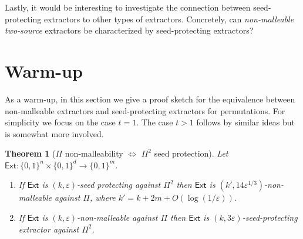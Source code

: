 \documentclass[11pt]{article}
\numberwithin{equation}{section}
\newtheorem{theorem}{Theorem}[section]
\theoremstyle{definition}
\theoremstyle{plain}
\newcommand{\ext}{\mathsf{Ext}}
\newcommand{\eps}{\varepsilon}
\newcommand{\perfam}{\Pi}
\begin{document}
Lastly, it would be interesting to investigate the connection between seed-protecting extractors to other types of extractors. Concretely, can \emph{non-malleable two-source} extractors be characterized by seed-protecting extractors?

%



\section{Warm-up}\label{sec:overview}

As a warm-up, in this section we give a proof sketch for the equivalence between non-malleable extractors and seed-protecting extractors for permutations. For simplicity we focus on the case $t = 1$. The case $t > 1$ follows by similar ideas but is somewhat more involved. 

\begin{theorem}[$\perfam$ non-malleability $\iff$ $\perfam^2$ seed protection]\label{thm:warmup}
Let $\ext \colon \{0,1\}^n \times \{0,1\}^d \to \{0,1\}^m$.%
\begin{enumerate}
	\item If $\ext$ is $(k,\eps)$-seed protecting against $\perfam^2$ then $\ext$ is $(k',14\eps^{1/3})$-non-malleable against $\perfam$, where $k' = k+2m+O(\log(1/\eps))$.
	\item If $\ext$ is $(k,\eps)$-non-malleable against $\perfam$ then $\ext$ is $(k,3\eps)$-seed-protecting extractor against $\perfam^2$.
\end{enumerate}
\end{theorem}
\end{document}
